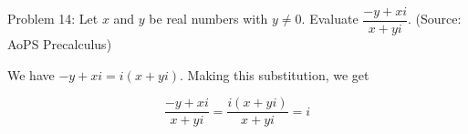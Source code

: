Problem 14: Let $x$ and $y$ be real numbers with $y \neq 0$. Evaluate $\dfrac{-y + xi}{x + yi}$. (Source: AoPS Precalculus)

We have $-y + xi = i(x + yi)$. Making this substitution, we get

$$ \frac{-y + xi}{x + yi} = \frac{i(x + yi)}{x + yi} = \boxed{i} $$
